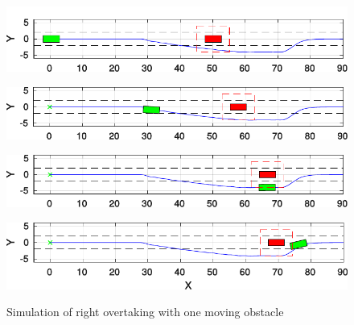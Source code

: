 \documentclass[conference, 11pt]{IEEEtran}
\begin{document}
\begin{figure}[!h]
	\centering
	\begin{minipage}[t]{\columnwidth}
	\includegraphics[width=1\columnwidth]{../../MATLAB/one_obstacle_right_overtaking/figure/overtaking_paper/overtaking_start.pdf}
	\label{fig:obstacleAvoidance_start}
	\end{minipage}
	\begin{minipage}[t]{\columnwidth}
	\includegraphics[width=1\columnwidth]{../../MATLAB/one_obstacle_right_overtaking/figure/overtaking_paper/overtaking_middle.pdf}
	\label{fig:obstacleAvoidance_middle}
	\end{minipage}
	\begin{minipage}[t]{\columnwidth}
	\includegraphics[width=1\columnwidth]{../../MATLAB/one_obstacle_right_overtaking/figure/overtaking_paper/overtaking_middle_end.pdf}
	\label{fig:obstacleAvoidance_middle_end}
	\end{minipage}
	\begin{minipage}[t]{\columnwidth}
	\includegraphics[width=1\columnwidth]{../../MATLAB/one_obstacle_right_overtaking/figure/overtaking_paper/overtaking_end.pdf}
	\label{fig:obstacleAvoidance_end}
	\end{minipage}
	\caption{Simulation of right overtaking with one moving obstacle}
\end{figure}
\end{document}
